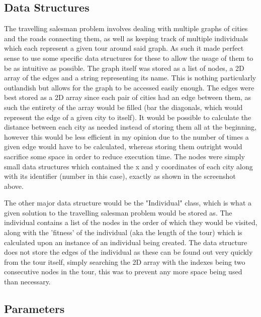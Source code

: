 \documentclass[11pt,a4paper,titlepage]{article}
\begin{document}
\subsection{Data Structures}

The travelling salesman problem involves dealing with multiple graphs of cities and the roads connecting them, as well as keeping track of multiple individuals which each represent a given tour around said graph. As such it made perfect sense to use some specific data structures for these to allow the usage of them to be as intuitive as possible. The graph itself was stored as a list of nodes, a 2D array of the edges and a string representing its name. This is nothing particularly outlandish but allows for the graph to be accessed easily enough. The edges were best stored as a 2D array since each pair of cities had an edge between them, as such the entirety of the array would be filled (bar the diagonals, which would represent the edge of a given city to itself). It would be possible to calculate the distance between each city as needed instead of storing them all at the beginning, however this would be less efficient in my opinion due to the number of times a given edge would have to be calculated, whereas storing them outright would sacrifice some space in order to reduce execution time. The nodes were simply small data structures which contained the x and y coordinates of each city along with its identifier (number in this case), exactly as shown in the screenshot above.

The other major data structure would be the "Individual" class, which is what a given solution to the travelling salesman problem would be stored as. The individual contains a list of the nodes in the order of which they would be visited, along with the 'fitness' of the individual (aka the length of the tour) which is calculated upon an instance of an individual being created. The data structure does not store the edges of the individual as these can be found out very quickly from the tour itself, simply searching the 2D array with the indexes being two consecutive nodes in the tour, this was to prevent any more space being used than necessary.

\subsection{Parameters}
\end{document}
